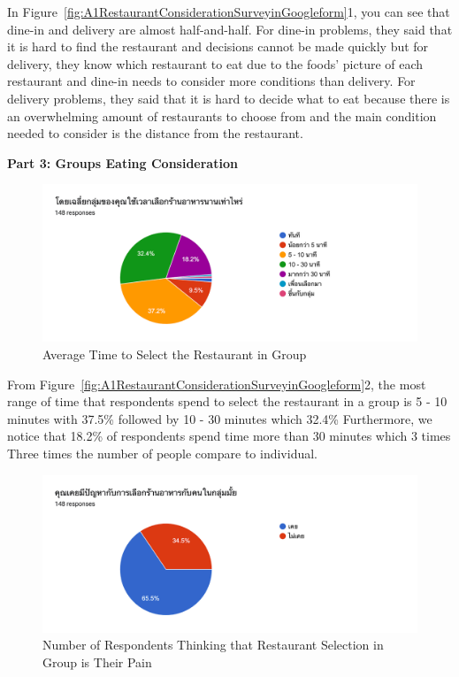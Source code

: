 \documentclass[12pt,oneside,openright,a4paper]{cpe-english-project}
\begin{document}
In Figure~\ref{fig:A1RestaurantConsiderationSurveyinGoogleform}1, you can see that dine-in and delivery are almost half-and-half. For dine-in problems, they said that it is hard to find the restaurant and decisions cannot be made quickly but for delivery, they know which restaurant to eat due to the foods’ picture of each restaurant and dine-in needs to consider more conditions than delivery. For delivery problems, they said that it is hard to decide what to eat because there is an overwhelming amount of restaurants to choose from and the main condition needed to consider is the distance from the restaurant.

\newpage
\textbf{Part 3: Groups Eating Consideration}

\begin{figure}[H]\centering
\includegraphics[width=350pt]{./images/A1AverageTimetoSelecttheRestaurantinGroup.png}
\caption{Average Time to Select the Restaurant in Group}\label{fig:A1AverageTimetoSelecttheRestaurantinGroup}
\end{figure}\vspace{-24pt}

From Figure~\ref{fig:A1RestaurantConsiderationSurveyinGoogleform}2, the most range of time that respondents spend to select the restaurant in a group is 5 - 10 minutes with 37.5\% followed by 10 - 30 minutes which 32.4\% Furthermore, we notice that 18.2\% of respondents spend time more than 30 minutes which 3 times Three times the number of people compare to individual.

\begin{figure}[H]\centering
\includegraphics[width=350pt]{./images/A1NumberofRespondentsThinkingthatRestaurantSelectioninGroupisTheirPain.png}
\caption{Number of Respondents Thinking that Restaurant Selection in Group is Their Pain}\label{fig:A1NumberofRespondentsThinkingthatRestaurantSelectioninGroupisTheirPain}
\end{figure}\vspace{-24pt}
\end{document}
